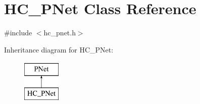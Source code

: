\hypertarget{classHC__PNet}{}\section{H\+C\+\_\+\+P\+Net Class Reference}
\label{classHC__PNet}


{\ttfamily \#include $<$hc\+\_\+pnet.\+h$>$}

Inheritance diagram for H\+C\+\_\+\+P\+Net\+:\begin{figure}[H]
\begin{center}
\leavevmode
\includegraphics[height=2.000000cm]{classHC__PNet}
\end{center}
\end{figure}
